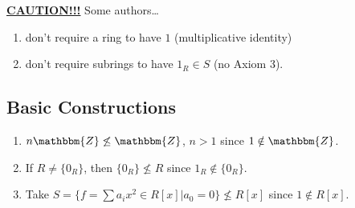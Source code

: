 \documentclass{article}
\newcommand{\Z}{\mathbbm{Z}}
\newcommand{\define}[1]{\textbf{\underline{#1}}}
\theoremstyle{definition}
\theoremstyle{remark}
\begin{document}
{            \noindent\define{CAUTION!!!} Some authors\ldots
            \begin{enumerate}
                \item don't require a ring to have $1$ (multiplicative identity)
                \item don't require subrings to have $1_R \in S$ (no Axiom 3).
            \end{enumerate}
        
        \subsection*{Basic Constructions}{
            \begin{enumerate}
                \item $n\Z \not\leq \Z$, $n>1$ since $1 \notin \Z$.
                \item If $R \neq \{0_R\}$, then $\{0_R\}\not\leq R$ since $1_R \notin \{0_R\}$.
                \item Take $S=\{f=\sum a_ix^2 \in R[x]|a_0=0\}\not\leq R[x]$ since $1 \notin R[x]$.
            \end{enumerate}
        }
    }
    
\end{document}

